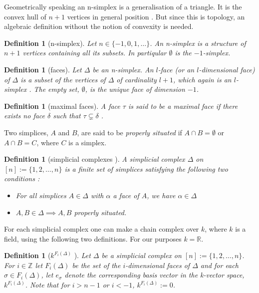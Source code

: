 \documentclass[11pt,a4paper,twoside]{report}
\newtheorem{mydef}[mythm]{Definition}
\begin{document}
Geometrically speaking an n-simplex is a generalisation of a triangle. It is the convex hull of $n+1$ vertices in general position \cite{Nadathur}. But since this is topology, an algebraic definition without the notion of convexity is needed.

\begin{mydef}[n-simplex]
Let $n\in\{-1,0,1,\dots\}$. An n-simplex is a structure of $n+1$ vertices containing all its subsets. In partiqular $\emptyset$ is the $-1$-simplex.
\end{mydef}

\begin{mydef}[faces]
Let $\Delta$ be an n-simplex. An $l$-face (or an $l$-dimensional face) of $\Delta$ is a subset of the vertices of $\Delta$ of cardinality $l+1$, which again is an $l$-simplex \cite{Nadathur}. The empty set, $\emptyset$, is the unique face of dimension $-1$\cite{Allgaier}.
\end{mydef}

\begin{mydef}[maximal faces]
A face $\tau$ is said to be a maximal face if there exists no face $\delta$ such that $\tau \subsetneq \delta$ \cite[p.15]{Jonsson}.
\end{mydef}

Two simplices, $A$ and $B$, are said to be \textit{properly situated} if $A\cap B=\emptyset$ or $A\cap B = C$, where $C$ is a simplex.\cite{Nadathur}

\begin{mydef}[simplicial complexes \cite{Nadathur}]
A simplicial complex $\Delta$ on $[n] := \{1,2,\dots ,n\}$ is a finite set of simplices satisfying the following two conditions :
\begin{itemize}
\item For all simplices $A\in\Delta$ with $\alpha$ a face of $A$, we have $\alpha\in\Delta$
\item $A,B\in\Delta\implies A, B $ properly situated.
\end{itemize}
\end{mydef}

For each simplicial complex one can make a chain complex over $k$, where $k$ is a field, using the following two definitions. For our purposes $k=\mathbb{R}$.

\begin{mydef}[$k^{F_i(\Delta)}$ \cite{Allgaier}]
Let $\Delta$ be a simplicial complex on $[n] := \{1,2,\dots ,n\}$. For $i\in \mathbb{Z}$ let $F_i(\Delta)$ be the set of the $i$-dimensional faces of $\Delta$ and for each $\sigma\in F_i(\Delta)$, let $e_{\sigma}$ denote the corresponding basis vector in the k-vector space, $k^{F_i(\Delta)}$. Note that for $i>n-1$ or $i<-1$, $k^{F_i(\Delta)}:=0$.
\end{mydef}
\end{document}
